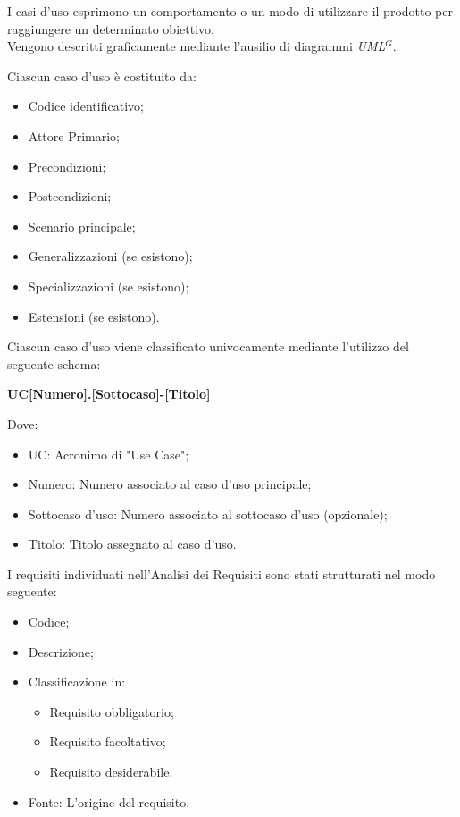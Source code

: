 

    I casi d’uso esprimono un comportamento o un modo di utilizzare il prodotto per raggiungere un determinato obiettivo. \\
    Vengono descritti graficamente mediante l’ausilio di diagrammi \emph{UML}$^{G}$.

    Ciascun caso d’uso è costituito da:
    \begin{itemize}
        \item Codice identificativo;
        \item Attore Primario;
        \item Precondizioni;
        \item Postcondizioni;
        \item Scenario principale;
        \item Generalizzazioni (se esistono);
        \item Specializzazioni (se esistono);
        \item Estensioni (se esistono).
    \end{itemize}


    Ciascun caso d’uso viene classificato univocamente mediante l’utilizzo del seguente schema:

        \begin{center}
            \large{\textbf{UC[Numero].[Sottocaso]-[Titolo]}}
        \end{center}
    Dove:
    \begin{itemize}
        \item UC: Acronimo di "Use Case";
        \item Numero: Numero associato al caso d'uso principale;
        \item Sottocaso d'uso: Numero associato al sottocaso d'uso (opzionale);
        \item Titolo: Titolo assegnato al caso d'uso.
    \end{itemize}


    I requisiti individuati nell’Analisi dei Requisiti sono stati strutturati nel modo seguente:

    \begin{itemize}
        \item Codice;
        \item Descrizione;
        \item Classificazione in:
          \begin{itemize}
            \item Requisito obbligatorio;
            \item Requisito facoltativo;
            \item Requisito desiderabile.
          \end{itemize}
        \item Fonte: L'origine del requisito.
    \end{itemize}

